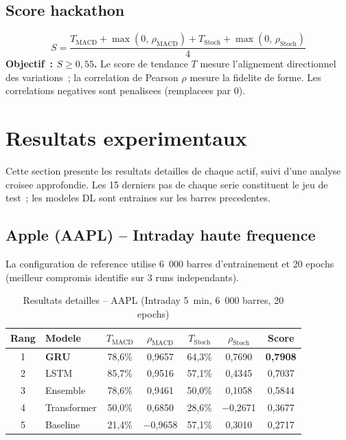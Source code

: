 \documentclass[12pt, a4paper]{article}
\begin{document}
\subsection{Score hackathon}

\begin{formulebox}
\begin{equation}
  S = \frac{T_\text{MACD} + \max(0,\, \rho_\text{MACD}) + T_\text{Stoch} + \max(0,\, \rho_\text{Stoch})}{4}
\end{equation}
\textbf{Objectif~: $S \geq 0{,}55$.} Le score de tendance $T$ mesure l'alignement directionnel des variations~; la correlation de Pearson $\rho$ mesure la fidelite de forme. Les correlations negatives sont penalisees (remplacees par 0).
\end{formulebox}

\section{Resultats experimentaux}

Cette section presente les resultats detailles de chaque actif, suivi d'une analyse croisee approfondie. Les 15 derniers pas de chaque serie constituent le jeu de test~; les modeles DL sont entraines sur les barres precedentes.

\subsection{Apple (AAPL) -- Intraday haute frequence}

La configuration de reference utilise 6~000 barres d'entrainement et 20 epochs (meilleur compromis identifie sur 3 runs independants).

\begin{table}[H]
\centering
\caption{Resultats detailles -- AAPL (Intraday 5~min, 6~000 barres, 20 epochs)}
\begin{tabular}{clccccc}
\toprule
\textbf{Rang} & \textbf{Modele} & $T_\text{MACD}$ & $\rho_\text{MACD}$ & $T_\text{Stoch}$ & $\rho_\text{Stoch}$ & \textbf{Score} \\
\midrule
\rowcolor{vertclair}
1 & \textbf{GRU}   & 78,6\% & 0,9657 & 64,3\% & 0,7690 & \textbf{0,7908} \\
2 & LSTM           & 85,7\% & 0,9516 & 57,1\% & 0,4345 & 0,7037 \\
3 & Ensemble       & 78,6\% & 0,9461 & 50,0\% & 0,1058 & 0,5844 \\
4 & Transformer    & 50,0\% & 0,6850 & 28,6\% & $-$0,2671 & 0,3677 \\
\rowcolor{rougeclair}
5 & Baseline       & 21,4\% & $-$0,9658 & 57,1\% & 0,3010 & 0,2717 \\
\bottomrule
\end{tabular}
\end{table}
\end{document}
